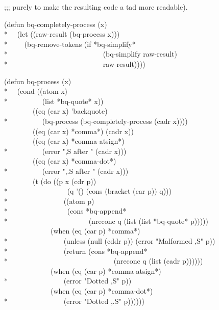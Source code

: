 \begin{new}
\begin{lisp}
;;; purely to make the resulting code a tad more readable).
\end{lisp}
\begin{lisp}
(defun bq-completely-process (x) \\*
~~(let ((raw-result (bq-process x))) \\*
~~~~(bq-remove-tokens (if *bq-simplify* \\*
~~~~~~~~~~~~~~~~~~~~~~~~~~(bq-simplify raw-result) \\*
~~~~~~~~~~~~~~~~~~~~~~~~~~raw-result))))
\end{lisp}
\begin{lisp}
(defun bq-process (x) \\*
~~(cond ((atom x) \\*
~~~~~~~~~(list *bq-quote* x)) \\
~~~~~~~~((eq (car x) 'backquote) \\*
~~~~~~~~~(bq-process (bq-completely-process (cadr x)))) \\
~~~~~~~~((eq (car x) *comma*) (cadr x)) \\
~~~~~~~~((eq (car x) *comma-atsign*) \\*
~~~~~~~~~(error ",{\Xatsign}{\Xtilde}S after {\Xbq}" (cadr x))) \\
~~~~~~~~((eq (car x) *comma-dot*) \\*
~~~~~~~~~(error ",.{\Xtilde}S after {\Xbq}" (cadr x))) \\
~~~~~~~~(t (do ((p x (cdr p)) \\*
~~~~~~~~~~~~~~~~(q '() (cons (bracket (car p)) q))) \\*
~~~~~~~~~~~~~~~((atom p) \\*
~~~~~~~~~~~~~~~~(cons *bq-append* \\*
~~~~~~~~~~~~~~~~~~~~~~(nreconc q (list (list *bq-quote* p))))) \\
~~~~~~~~~~~~~(when (eq (car p) *comma*) \\*
~~~~~~~~~~~~~~~(unless (null (cddr p)) (error "Malformed ,{\Xtilde}S" p)) \\*
~~~~~~~~~~~~~~~(return (cons *bq-append* \\*
~~~~~~~~~~~~~~~~~~~~~~~~~~~~~(nreconc q (list (cadr p)))))) \\
~~~~~~~~~~~~~(when (eq (car p) *comma-atsign*) \\*
~~~~~~~~~~~~~~~(error "Dotted ,{\Xatsign}{\Xtilde}S" p)) \\
~~~~~~~~~~~~~(when (eq (car p) *comma-dot*) \\*
~~~~~~~~~~~~~~~(error "Dotted ,.{\Xtilde}S" p))))))

\end{lisp}
\end{new}
